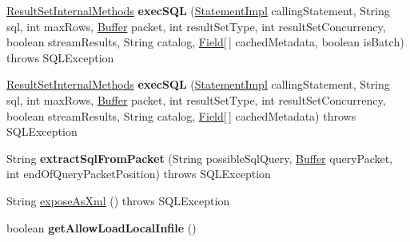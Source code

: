 \begin{DoxyCompactItemize}
\mbox{\hyperlink{interfacecom_1_1mysql_1_1jdbc_1_1_result_set_internal_methods}{Result\+Set\+Internal\+Methods}} {\bfseries exec\+S\+QL} (\mbox{\hyperlink{classcom_1_1mysql_1_1jdbc_1_1_statement_impl}{Statement\+Impl}} calling\+Statement, String sql, int max\+Rows, \mbox{\hyperlink{classcom_1_1mysql_1_1jdbc_1_1_buffer}{Buffer}} packet, int result\+Set\+Type, int result\+Set\+Concurrency, boolean stream\+Results, String catalog, \mbox{\hyperlink{classcom_1_1mysql_1_1jdbc_1_1_field}{Field}}\mbox{[}$\,$\mbox{]} cached\+Metadata, boolean is\+Batch)  throws S\+Q\+L\+Exception 
\item 
\mbox{\label{classcom_1_1mysql_1_1jdbc_1_1_multi_host_my_s_q_l_connection_a78524ecd8f974829c04c16a219e54c67}} 
\mbox{\hyperlink{interfacecom_1_1mysql_1_1jdbc_1_1_result_set_internal_methods}{Result\+Set\+Internal\+Methods}} {\bfseries exec\+S\+QL} (\mbox{\hyperlink{classcom_1_1mysql_1_1jdbc_1_1_statement_impl}{Statement\+Impl}} calling\+Statement, String sql, int max\+Rows, \mbox{\hyperlink{classcom_1_1mysql_1_1jdbc_1_1_buffer}{Buffer}} packet, int result\+Set\+Type, int result\+Set\+Concurrency, boolean stream\+Results, String catalog, \mbox{\hyperlink{classcom_1_1mysql_1_1jdbc_1_1_field}{Field}}\mbox{[}$\,$\mbox{]} cached\+Metadata)  throws S\+Q\+L\+Exception 
\item 
\mbox{\label{classcom_1_1mysql_1_1jdbc_1_1_multi_host_my_s_q_l_connection_a4813b4ae9a7dec4fc04188a99cd404ea}} 
String {\bfseries extract\+Sql\+From\+Packet} (String possible\+Sql\+Query, \mbox{\hyperlink{classcom_1_1mysql_1_1jdbc_1_1_buffer}{Buffer}} query\+Packet, int end\+Of\+Query\+Packet\+Position)  throws S\+Q\+L\+Exception 
\item 
String \mbox{\hyperlink{classcom_1_1mysql_1_1jdbc_1_1_multi_host_my_s_q_l_connection_acaae1022ce53ec5e0ba07c1a90244af2}{expose\+As\+Xml}} ()  throws S\+Q\+L\+Exception 
\item 
\mbox{\label{classcom_1_1mysql_1_1jdbc_1_1_multi_host_my_s_q_l_connection_a66545da97d721f26d3c9bc1123a04b00}} 
boolean {\bfseries get\+Allow\+Load\+Local\+Infile} ()
\item 
\mbox{\label{classcom_1_1mysql_1_1jdbc_1_1_multi_host_my_s_q_l_connection_abf0d73b1caea010cfe9c8cfe5966ce77}} 

\end{DoxyCompactItemize}
